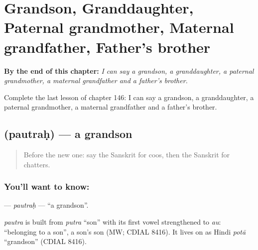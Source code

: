 
\chapter{Grandson, Granddaughter, Paternal grandmother, Maternal grandfather, Father's brother}
\label{ch:sa-grandson-granddaughter-paternal-grandmother-maternal-grandfather-father-s-brother}

\begin{chapteropening}
\textbf{By the end of this chapter:} \emph{I can say a grandson, a granddaughter, a paternal grandmother, a maternal grandfather and a father's brother.}

Complete the last lesson of chapter 146: I can say a grandson, a granddaughter, a paternal grandmother, a maternal grandfather and a father's brother.
\end{chapteropening}

\section[\texorpdfstring{\sk{पौत्रः} (pautraḥ)}{पौत्रः (pautraḥ)}]{ (pautraḥ) — a grandson}

\label{lesson:SA-C146-pautrah}



\begin{quote}
Before the new one: say the Sanskrit for coos, then the Sanskrit for chatters.
\end{quote}

\subsection*{You'll want to know: }
\textbf{} — \emph{pautraḥ} — \textquotedblleft{}a grandson\textquotedblright{}.

\begin{cousinweb}
\emph{pautra} is built from \emph{putra} \textquotedblleft{}son\textquotedblright{} with its first vowel strengthened to \emph{au}: \textquotedblleft{}belonging to a son\textquotedblright{}, a son's son (MW; CDIAL 8416). It lives on as Hindi \emph{potā} \textquotedblleft{}grandson\textquotedblright{} (CDIAL 8416).
\end{cousinweb}

